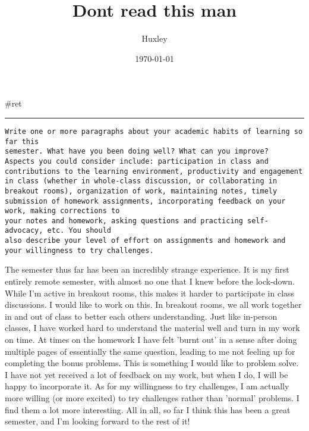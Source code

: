 \documentclass[letterpaper]{article}
\author{Huxley}
\date{\today}
\title{Dont read this man}
\renewcommand\maketitle{}
\begin{document}
\maketitle
\#ret

\noindent\rule{\textwidth}{0.5pt}

\begin{verbatim}
Write one or more paragraphs about your academic habits of learning so far this
semester. What have you been doing well? What can you improve?
Aspects you could consider include: participation in class and contributions to the learning environment, productivity and engagement in class (whether in whole-class discussion, or collaborating in breakout rooms), organization of work, maintaining notes, timely submission of homework assignments, incorporating feedback on your work, making corrections to
your notes and homework, asking questions and practicing self-advocacy, etc. You should
also describe your level of effort on assignments and homework and your willingness to try challenges.
\end{verbatim}

The semester thus far has been an incredibly strange experience. It is
my first entirely remote semester, with almost no one that I knew before
the lock-down. While I'm active in breakout rooms, this makes it harder
to participate in class discussions. I would like to work on this. In
breakout rooms, we all work together in and out of class to better each
others understanding. Just like in-person classes, I have worked hard to
understand the material well and turn in my work on time. At times on
the homework I have felt 'burnt out' in a sense after doing multiple
pages of essentially the same question, leading to me not feeling up for
completing the bonus problems. This is something I would like to problem
solve. I have not yet received a lot of feedback on my work, but when I
do, I will be happy to incorporate it. As for my willingness to try
challenges, I am actually more willing (or more excited) to try
challenges rather than 'normal' problems. I find them a lot more
interesting. All in all, so far I think this has been a great semester,
and I'm looking forward to the rest of it!
\end{document}
